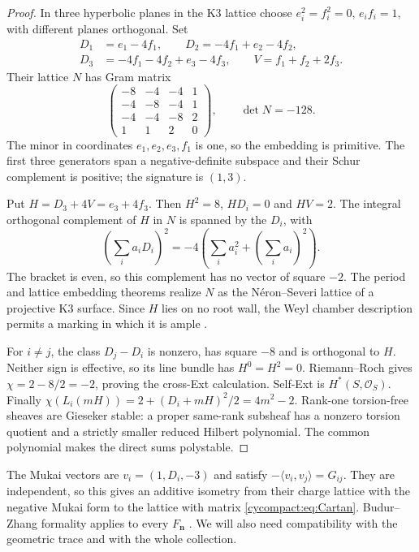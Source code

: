 \begin{proof}
In three hyperbolic planes in the K3 lattice choose
$e_i^2=f_i^2=0$, $e_if_i=1$, with different planes orthogonal.
Set
\[
\begin{split}
 D_1&=e_1-4f_1,\qquad D_2=-4f_1+e_2-4f_2,\\
 D_3&=-4f_1-4f_2+e_3-4f_3,\qquad V=f_1+f_2+2f_3.
\end{split}
\]
Their lattice $N$ has Gram matrix
\[
 \begin{pmatrix}
 -8&-4&-4&1\\-4&-8&-4&1\\-4&-4&-8&2\\1&1&2&0
 \end{pmatrix},\qquad\det N=-128.
\]
The minor in coordinates $e_1,e_2,e_3,f_1$ is one, so the
embedding is primitive. The first three generators span a
negative-definite subspace and their Schur complement is
positive; the signature is $(1,3)$.

Put $H=D_3+4V=e_3+4f_3$. Then $H^2=8$, $HD_i=0$ and
$HV=2$. The integral orthogonal complement of $H$ in $N$
is spanned by the $D_i$, with
\[
 \left(\sum_i a_iD_i\right)^2
 =-4\left(\sum_i a_i^2+\left(\sum_i a_i\right)^2\right).
\]
The bracket is even, so this complement has no vector of
square $-2$. The period and lattice embedding theorems
realize $N$ as the N\'{e}ron--Severi lattice of a projective
K3 surface. Since $H$ lies on no root wall, the Weyl chamber
description permits a marking in which it is ample
\cite[Chapters 8 and 14]{cycompact:Huybrechts}.

For $i\ne j$, the class $D_j-D_i$ is nonzero, has square
$-8$ and is orthogonal to $H$. Neither sign is effective,
so its line bundle has $H^0=H^2=0$. Riemann--Roch gives
$\chi=2-8/2=-2$, proving the cross-Ext calculation.
Self-Ext is $H^*(S,\mathcal O_S)$. Finally
$\chi(L_i(mH))=2+(D_i+mH)^2/2=4m^2-2$.
Rank-one torsion-free sheaves are Gieseker stable: a proper
same-rank subsheaf has a nonzero torsion quotient and a
strictly smaller reduced Hilbert polynomial. The common
polynomial makes the direct sums polystable.
\end{proof}

The Mukai vectors are $v_i=(1,D_i,-3)$ and satisfy
$-\langle v_i,v_j\rangle=G_{ij}$.
They are independent, so this gives an additive isometry
from their charge lattice with the negative Mukai form to
the lattice with matrix \eqref{cycompact:eq:Cartan}.
Budur--Zhang formality applies to every $F_{\mathbf n}$
\cite{cycompact:BudurZhang}. We will also need compatibility
with the geometric trace and with the whole collection.

